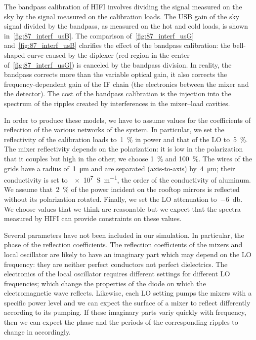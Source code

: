The bandpass calibration of HIFI involves dividing the signal measured on the sky by the signal measured on the calibration loads.
The USB gain of the sky signal divided by the bandpass, as measured on the hot and cold loads, is shown in~\cref{fig:87_interf_usB}.
The comparison of~\cref{fig:87_interf_usG} and~\cref{fig:87_interf_usB} clarifies the effect of the bandpass calibration: the bell-shaped curve caused by the diplexer (red region in the center of~\cref{fig:87_interf_usG}) is canceled by the bandpass division.
In reality, the bandpass corrects more than the variable optical gain, it also corrects the frequency-dependent gain of the IF chain (the electronics between the mixer and the detector).
The cost of the bandpass calibration is the injection into the spectrum of the ripples created by interferences in the mixer--load cavities.

In order to produce these models, we have to assume values for the coefficients of reflection of the various networks of the system.
In particular, we set the reflectivity of the calibration loads to~\SI{1}{\percent} in power and that of the LO to~\SI{5}{\percent}.
The mixer reflectivity depends on the polarization: it is low in the polarization that it couples but high in the other; we choose \SI{1}{\percent} and \SI{100}{\percent}.
The wires of the grids have a radius of~\SI{1}{\micro\meter} and are separated (axis-to-axis) by~\SI{4}{\micro\meter}; their conductivity is set to~\SI{e7}{\siemens\per\meter}, the order of the conductivity of aluminum.
We assume that~\SI{2}{\percent} of the power incident on the rooftop mirrors is reflected without its polarization rotated.
Finally, we set the LO attenuation to~\SI{-6}{\decibel}.
We choose values that we think are reasonable but we expect that the spectra measured by HIFI can provide constraints on these values.

Several parameters have not been included in our simulation.
In particular, the phase of the reflection coefficients.
The reflection coefficients of the mixers and local oscillator are likely to have an imaginary part which may depend on the LO frequency: they are neither perfect conductors not perfect dielectrics.
The electronics of the local oscillator requires different settings for different LO frequencies; which change the properties of the diode on which the electromagnetic wave reflects.
Likewise, each LO setting pumps the mixers with a specific power level and we can expect the surface of a mixer to reflect differently according to its pumping.
If these imaginary parts variy quickly with frequency, then we can expect the phase and the periods of the corresponding ripples to change in accordingly.


